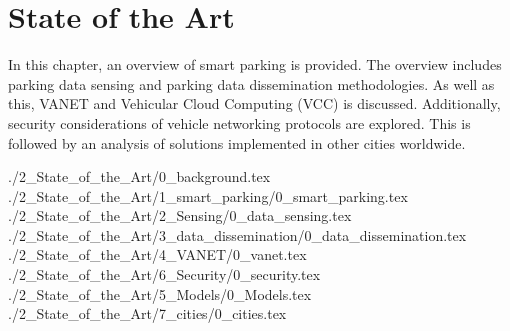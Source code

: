 \chapter{State of the Art}
In this chapter, an overview of smart parking is provided. The overview includes parking data sensing and parking data dissemination methodologies. As well as this, \ac{VANET} and Vehicular Cloud Computing (VCC) is discussed. Additionally, security considerations of vehicle networking protocols are explored. This is followed by an analysis of solutions implemented in other cities worldwide.

{./2_State_of_the_Art/0_background.tex}
{./2_State_of_the_Art/1_smart_parking/0_smart_parking.tex}
{./2_State_of_the_Art/2_Sensing/0_data_sensing.tex}
{./2_State_of_the_Art/3_data_dissemination/0_data_dissemination.tex}
{./2_State_of_the_Art/4_VANET/0_vanet.tex}
{./2_State_of_the_Art/6_Security/0_security.tex}
{./2_State_of_the_Art/5_Models/0_Models.tex}
{./2_State_of_the_Art/7_cities/0_cities.tex}